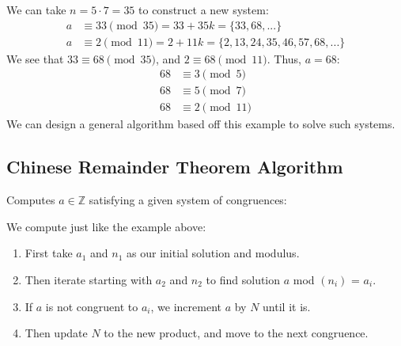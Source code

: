 \noindent
We can take $n=5\cdot7=35$ to construct a new system:
\begin{align*}
    a &\equiv 33 \pmod{35} = 33+35k = \{33,68,...\} \\
    a &\equiv 2 \pmod{11} = 2+11k = \{2,13,24,35,46,57,68,...\}
\end{align*}
We see that $33\equiv 68\pmod{35}$, and $2\equiv 68\pmod{11}$. Thus, $a=68$:
\begin{align*}
    68 &\equiv 3 \pmod{5} \\
    68 &\equiv 5 \pmod{7} \\
    68 &\equiv 2 \pmod{11}
\end{align*}
We can design a general algorithm based off this example to solve such systems.

\newpage
\subsection*{Chinese Remainder Theorem Algorithm}
\begin{Func}
Computes \( a\in\mathbb{Z} \) satisfying a given system of congruences:

\begin{algorithm}[H]
    \SetAlgoLined
    \vspace{.5em}
\end{algorithm}
\end{Func}
We compute just like the example above:
\begin{enumerate}
    \item First take $a_1$ and $n_1$ as our initial solution and modulus.
    \item Then iterate starting with $a_2$ and $n_2$ to find solution $a$ mod $(n_i)$ = $a_i$.
    \item If $a$ is not congruent to $a_i$, we increment $a$ by $N$ until it is.
    \item Then update $N$ to the new product, and move to the next congruence.
\end{enumerate}

    